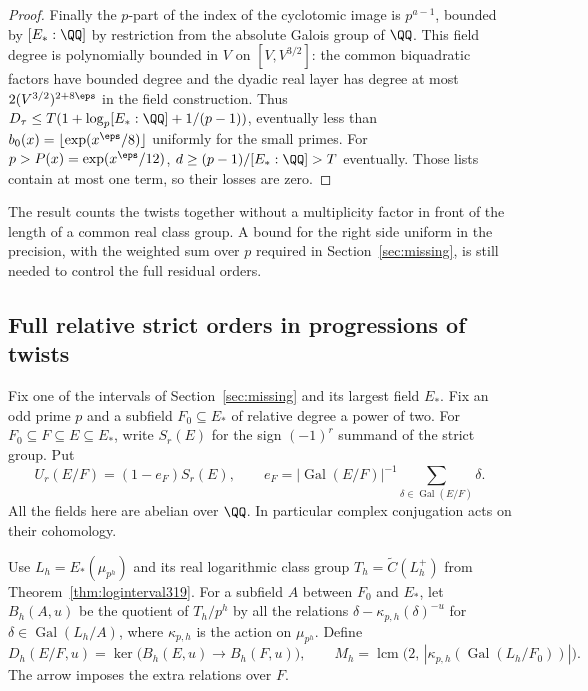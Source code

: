 \documentclass[a4paper,11pt]{article}
\theoremstyle{definition}
\theoremstyle{remark}
\numberwithin{equation}{section}
\begin{document}
\begin{proof}
Finally the \(p\)-part of the index of the cyclotomic image
is \(p^{a-1}\), bounded by \([E_*:\QQ]\) by restriction
from the absolute Galois group of \(\QQ\). This field degree
is polynomially bounded in \(V\) on \([V,V^{3/2}]\):
the common biquadratic factors have bounded degree and the
dyadic real layer has degree at most \(2(V^{3/2})^{2+8\eps}\)
in the field construction. Thus
\(D_\tau\le T(1+\log_p[E_*:\QQ]+1/(p-1))\), eventually
less than \(b_0(x)=\lfloor\exp(x^\eps/8)\rfloor\) uniformly
for the small primes. For \(p>P(x)=\exp(x^\eps/12)\),
\(d\ge(p-1)/[E_*:\QQ]>T\) eventually. Those lists contain
at most one term, so their losses are zero.
\end{proof}

The result counts the twists together without a multiplicity
factor in front of the length of a common real class group.
A bound for the right side uniform in the precision, with the
weighted sum over \(p\) required in Section~\ref{sec:missing},
is still needed to control the full residual orders.

\subsection{Full relative strict orders in progressions of twists}\label{nav:II-79}
Fix one of the intervals of Section~\ref{sec:missing} and its
largest field \(E_*\). Fix an odd prime \(p\) and a subfield
\(F_0\subseteq E_*\) of relative degree a power of two. For
\(F_0\subseteq F\subseteq E\subseteq E_*\), write \(S_r(E)\)
for the sign \((-1)^r\) summand of the strict group. Put
\[
 U_r(E/F)=(1-e_F)S_r(E),\qquad
 e_F=|\operatorname{Gal}(E/F)|^{-1}
                         \sum_{\delta\in\operatorname{Gal}(E/F)}\delta .
\]
All the fields here are abelian over \(\QQ\). In particular
complex conjugation acts on their cohomology.

Use \(L_h=E_*(\mu_{p^h})\) and its real logarithmic class
group \(T_h=\widetilde C(L_h^+)\) from
Theorem~\ref{thm:loginterval319}. For a subfield \(A\)
between \(F_0\) and \(E_*\), let \(B_h(A,u)\) be the quotient
of \(T_h/p^h\) by all the relations
\(\delta-\kappa_{p,h}(\delta)^{-u}\) for
\(\delta\in\operatorname{Gal}(L_h/A)\), where \(\kappa_{p,h}\)
is the action on \(\mu_{p^h}\). Define
\[
 D_h(E/F,u)=\ker\bigl(B_h(E,u)\longrightarrow B_h(F,u)\bigr),
 \qquad
 M_h=\operatorname{lcm}\bigl(2,\,
      |\kappa_{p,h}(\operatorname{Gal}(L_h/F_0))|\bigr).
\]
The arrow imposes the extra relations over \(F\).
\end{document}
